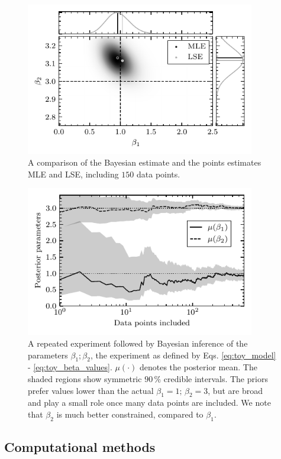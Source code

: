 \begin{figure}[h]
 	\centering
 	\includegraphics[width=10cm]{figures/bayesian_multivariate.pdf}
 	\caption{A comparison of the Bayesian estimate and the points estimates MLE and LSE, including $150$ data points.}
 	\label{fig:bayesian_multivariate}
\end{figure}

\begin{figure}[h]
 	\centering
 	\includegraphics[width=10cm]{figures/bayesian.pdf}
 	\caption{A repeated experiment followed by Bayesian inference of the parameters $\beta_1; \beta_2$, the experiment as defined by Eqs. \ref{eq:toy_model} - \ref{eq:toy_beta_values}. $\mu(\cdot)$ denotes the posterior mean. The shaded regions show symmetric $90 \, \%$ credible intervals. The priors prefer values lower than the actual $\beta_1=1;\,\beta_2=3$, but are broad and play a small role once many data points are included. We note that $\beta_2$ is much better constrained, compared to $\beta_1$.}
 	\label{fig:bayesian_demosntration}
\end{figure}

\subsection{Computational methods}


